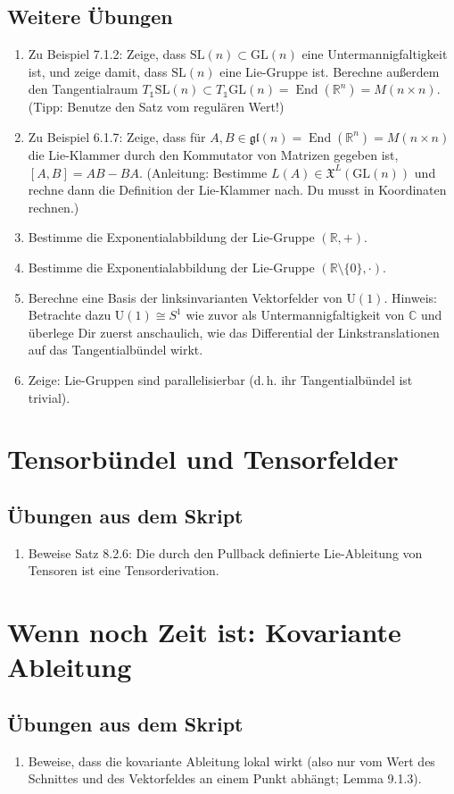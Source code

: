 \documentclass[a4paper,headsepline,headheight=30pt,numbers=enddot]{scrartcl}
\DeclareMathOperator{\End}{End}
\newcommand{\R}{\mathbb{R}}
\newcommand{\vf}{\mathfrak{X}}
\begin{document}
	\subsection*{Weitere Übungen}
	\begin{enumerate}
		\item Zu Beispiel 7.1.2: Zeige, dass $\mathrm{SL}(n) \subset \mathrm{GL}(n)$ eine Untermannigfaltigkeit ist, und zeige damit, dass $\mathrm{SL}(n)$ eine Lie-Gruppe ist. Berechne außerdem den Tangentialraum $T_\mathds{1}\mathrm{SL}(n) \subset T_\mathds{1}\mathrm{GL}(n) = \End(\R^n) = M(n\times n)$. (Tipp: Benutze den Satz vom regulären Wert!)
		\item Zu Beispiel 6.1.7: Zeige, dass für $A,B \in \mathfrak{gl}(n) = \End(\R^n) = M(n\times n)$ die Lie-Klammer durch den Kommutator von Matrizen gegeben ist, $[A,B] = AB - BA$. (Anleitung: Bestimme $L(A) \in \vf^L(\mathrm{GL}(n))$ und rechne dann die Definition der Lie-Klammer nach. Du musst in Koordinaten rechnen.)
		\item Bestimme die Exponentialabbildung der Lie-Gruppe $(\R,+)$.
		\item Bestimme die Exponentialabbildung der Lie-Gruppe $(\R\setminus\{0\},\cdot)$.
		\item Berechne eine Basis der linksinvarianten Vektorfelder von $\mathrm{U}(1)$. Hinweis: Betrachte dazu $\mathrm{U}(1)\cong S^1$ wie zuvor als Untermannigfaltigkeit von $\mathbb{C}$ und überlege Dir zuerst anschaulich, wie das Differential der Linkstranslationen auf das Tangentialbündel wirkt.
		\item Zeige: Lie-Gruppen sind parallelisierbar (d.\,h. ihr Tangentialbündel ist trivial).
	\end{enumerate}
	
	\newpage
	\section{Tensorbündel und Tensorfelder}
	\subsection*{Übungen aus dem Skript}
	\begin{enumerate}
		\item Beweise Satz 8.2.6: Die durch den Pullback definierte Lie-Ableitung von Tensoren ist eine Tensorderivation.
	\end{enumerate}

	\newpage
	\section{Wenn noch Zeit ist: Kovariante Ableitung}
	\subsection*{Übungen aus dem Skript}
	\begin{enumerate}
		\item Beweise, dass die kovariante Ableitung lokal wirkt (also nur vom Wert des Schnittes und des Vektorfeldes an einem Punkt abhängt; Lemma 9.1.3).
	\end{enumerate}
\end{document}
